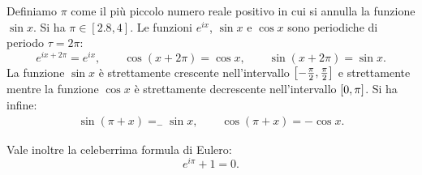 \begin{theorem}[definizione di $\pi$]
%
%
\label{th:pi}%
\mynote{$\pi$}%
Definiamo $\pi$ come il più piccolo numero reale
positivo in cui si annulla la funzione $\sin x$.
Si ha $\pi \in [2.8,4]$.
Le funzioni $e^{ix}$, $\sin x$ e $\cos x$ sono
periodiche di periodo $\tau = 2\pi$:
\mynote{$\tau$}%
\[
  e^{ix+2\pi} = e^{ix}, \qquad
  \cos(x + 2\pi) = \cos x, \qquad
  \sin(x + 2\pi) = \sin x.
\]
La funzione $\sin x$ è strettamente crescente nell'intervallo
$\left[-\frac \pi 2,\frac \pi 2\right]$ e strettamente 
mentre la funzione $\cos x$ è strettamente decrescente 
nell'intervallo $\left[0,\pi\right]$.
Si ha infine:
\begin{align*}
\sin(\pi + x) =_ -\sin x, \qquad 
\cos(\pi + x) = -\cos x.
\end{align*}

Vale inoltre la celeberrima formula di Eulero:
%
%
\[
  e^{i\pi} + 1 = 0.
\]
\end{theorem}
